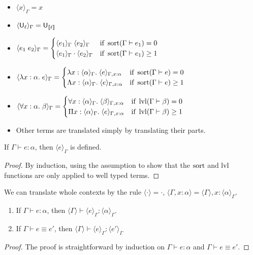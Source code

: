 \begin{itemize}
\item $\langle x\rangle_\Gamma=x$
\item $\langle\U_\ell\rangle_\Gamma=\U_{\scott{\ell}}$
\item $\langle e_1\;e_2\rangle_\Gamma=\begin{cases}
\langle e_1\rangle_\Gamma\;\langle e_2\rangle_\Gamma&\mbox{if }\sort(\Gamma\vdash e_1)=0\\
\langle e_1\rangle_\Gamma\cdot\langle e_2\rangle_\Gamma&\mbox{if }\sort(\Gamma\vdash e_1)\ge 1
\end{cases}$
\item $\langle \lambda x:\alpha.\;e\rangle_\Gamma=\begin{cases}
\lambda x:\langle\alpha\rangle_\Gamma.\;\langle e\rangle_{\Gamma,x:\alpha}&\mbox{if }\sort(\Gamma\vdash e)=0\\
\Lambda x:\langle\alpha\rangle_\Gamma.\;\langle e\rangle_{\Gamma,x:\alpha}&\mbox{if }\sort(\Gamma\vdash e)\ge 1
\end{cases}$
\item $\langle \forall x:\alpha.\;\beta\rangle_\Gamma=\begin{cases}
\forall x:\langle\alpha\rangle_\Gamma.\;\langle\beta\rangle_{\Gamma,x:\alpha}&\mbox{if }\lvl(\Gamma\vdash\beta)=0\\
\Pi x:\langle\alpha\rangle_\Gamma.\;\langle e\rangle_{\Gamma,x:\alpha}&\mbox{if }\lvl(\Gamma\vdash\beta)\ge 1
\end{cases}$
\item Other terms are translated simply by translating their parts.
\end{itemize}

\begin{theorem}
If $\Gamma\vdash e:\alpha$, then $\langle e\rangle_\Gamma$ is defined.
\end{theorem}
\begin{proof}
By induction, using the assumption to show that the $\operatorname{sort}$ and $\operatorname{lvl}$ functions are only applied to well typed terms.
\end{proof}
We can translate whole contexts by the rule $\langle\cdot\rangle=\cdot$, $\langle\Gamma,x:\alpha\rangle=\langle\Gamma\rangle,x:\langle\alpha\rangle_\Gamma$.

\begin{theorem}
\begin{enumerate}
\item If $\Gamma\vdash e:\alpha$, then $\langle\Gamma\rangle\vdash \langle e\rangle_\Gamma:\langle\alpha\rangle_\Gamma$.
\item If $\Gamma\vdash e\equiv e'$, then $\langle\Gamma\rangle\vdash \langle e\rangle_\Gamma:\langle e'\rangle_\Gamma$
\end{enumerate}
\end{theorem}
\begin{proof}
The proof is straightforward by induction on $\Gamma\vdash e:\alpha$ and $\Gamma\vdash e\equiv e'$.
\end{proof}

